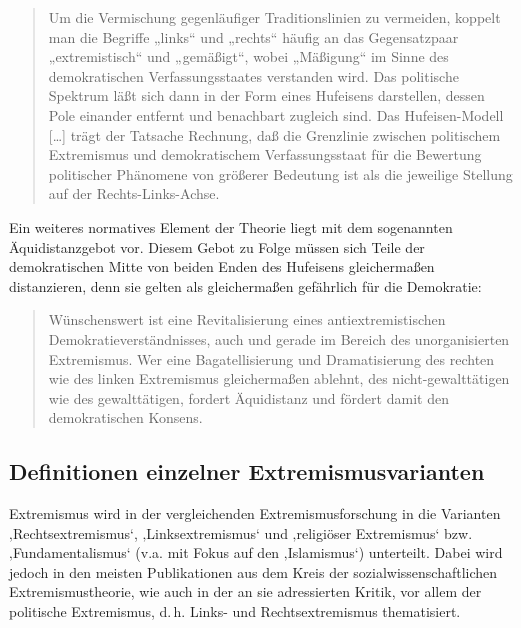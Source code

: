 \begin{quote}
Um die Vermischung gegenläufiger Traditionslinien zu vermeiden, koppelt man die Begriffe „links`` und „rechts`` häufig an das Gegensatzpaar „extremistisch`` und „gemäßigt``, wobei „Mäßigung`` im Sinne des demokratischen Verfassungsstaates verstanden wird. Das politische Spektrum läßt sich dann in der Form eines Hufeisens darstellen, dessen Pole einander entfernt und benachbart zugleich sind. Das Hufeisen-Modell {[}\ldots{]} trägt der Tatsache Rechnung, daß die Grenzlinie zwischen politischem Extremismus und demokratischem Verfassungsstaat für die Bewertung politischer Phänomene von größerer Bedeutung ist als die jeweilige Stellung auf der Rechts-Links-Achse. \autocite[251]{backesPolitischerExtremismusDemokratischen1989}
\end{quote}

Ein weiteres normatives Element der Theorie liegt mit dem sogenannten Äquidistanzgebot vor. Diesem Gebot zu Folge müssen sich Teile der demokratischen Mitte von beiden Enden des Hufeisens gleichermaßen distanzieren, denn sie gelten als gleichermaßen gefährlich für die Demokratie:

\begin{quote}
Wünschenswert ist eine Revitalisierung eines antiextremistischen Demokratieverständnisses, auch und gerade im Bereich des unorganisierten Extremismus. Wer eine Bagatellisierung und Dramatisierung des rechten wie des linken Extremismus gleichermaßen ablehnt, des nicht-gewalttätigen wie des gewalttätigen, fordert Äquidistanz und fördert damit den demokratischen Konsens. \autocite[519]{jesseGrenzenDemokratieschutzesOffenen2006}
\end{quote}

\subsection{Definitionen einzelner Extremismusvarianten}\label{definitionen-einzelner-extremismusvarianten}

Extremismus wird in der vergleichenden Extremismusforschung in die Varianten ‚Rechtsextremismus`, ‚Linksextremismus` und ‚religiöser Extremismus` bzw. ‚Fundamentalismus` (v.a. mit Fokus auf den ‚Islamismus`) unterteilt. Dabei wird jedoch in den meisten Publikationen aus dem Kreis der sozialwissenschaftlichen Extremismustheorie, wie auch in der an sie adressierten Kritik, vor allem der politische Extremismus, d.\,h. Links- und Rechtsextremismus thematisiert.

